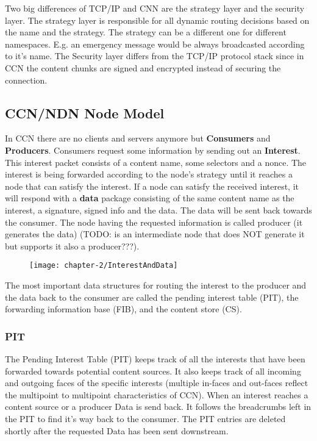 Two big differences of TCP/IP and CNN are the strategy layer and the security layer. The strategy layer is responsible for all dynamic routing decisions based on the name and the strategy. The strategy can be a different one for different namespaces. E.g. an emergency message would be always broadcasted according to it's name. The Security layer differs from the TCP/IP protocol stack since in CCN the content chunks are signed and encrypted instead of securing the connection.

\subsection{CCN/NDN Node Model}

In CCN there are no clients and servers anymore but \textbf{Consumers} and \textbf{Producers}. Consumers request some information by sending out an \textbf{Interest}. This interest packet consists of a content name, some selectors and a nonce. The interest is being forwarded according to the node's strategy until it reaches a node that can satisfy the interest. If a node can satisfy the received interest, it will respond with a \textbf{data} package consisting of the same content name as the interest, a signature, signed info and the data. The data will be sent back towards the consumer. The node having the requested information is called producer (it generates the data) (TODO: is an intermediate node that does NOT generate it but supports it also a producer???).

\begin{figure}[H]
\texttt{[image: chapter-2/InterestAndData]}
\centering
\end{figure}

The most important data structures for routing the interest to the producer and the data back to the consumer are called the pending interest table (PIT), the forwarding information base (FIB), and the content store (CS).

\subsubsection{PIT}

The Pending Interest Table (PIT) keeps track of all the interests that have been forwarded towards potential content sources. It also keeps track of all incoming and outgoing faces of the specific interests (multiple in-faces and out-faces reflect the multipoint to multipoint characteristics of CCN). When an interest reaches a content source or a producer Data is send back. It follows the breadcrumbs left in the PIT to find it's way back to the consumer. The PIT entries are deleted shortly after the requested Data has been sent downstream.

